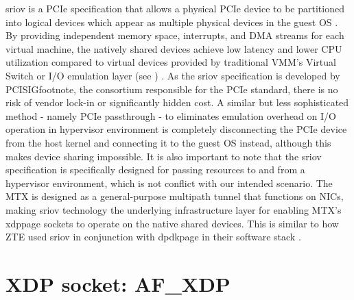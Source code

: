 \ac{sriov} is a \ac{PCIe} specification that allows a physical \ac{PCIe} device to be partitioned into logical devices which appear as multiple physical devices in the guest \ac{OS} \cite{ibm_sriov}\cite{vmware_sriov}. 
By providing independent memory space, interrupts, and \ac{DMA} streams for each virtual machine, the natively shared devices achieve low latency and lower CPU utilization compared to virtual devices provided by traditional \ac{VMM}'s Virtual Switch or  I/O emulation layer (see ) \cite{intel_sriov}.
As the \ac{sriov} specification is developed by \ac{PCISIGfootnote}, the consortium responsible for the \ac{PCIe} standard, there is no risk of vendor lock-in or significantly hidden cost.
A similar but less sophisticated method - namely \ac{PCIe} passthrough - to eliminates emulation overhead on I/O operation in hypervisor environment is completely disconnecting the \ac{PCIe} device from the host kernel and connecting it to the guest \ac{OS} instead, although this makes device sharing impossible.
It is also important to note that the \ac{sriov} specification is specifically designed for passing resources to and from a hypervisor environment, which is not conflict with our intended scenario.
The \ac{MTX} is designed as a general-purpose multipath tunnel that functions on \ac{NIC}s, making \ac{sriov} technology the underlying infrastructure layer for enabling \ac{MTX}'s \ac{xdppage} sockets to operate on the native shared devices.
This is similar to how \ac{ZTE} used \ac{sriov} in conjunction with \ac{dpdkpage} in their software stack \cite{zte_upf_full_whitepaper}.
\\

\section{XDP socket: AF\_XDP}
